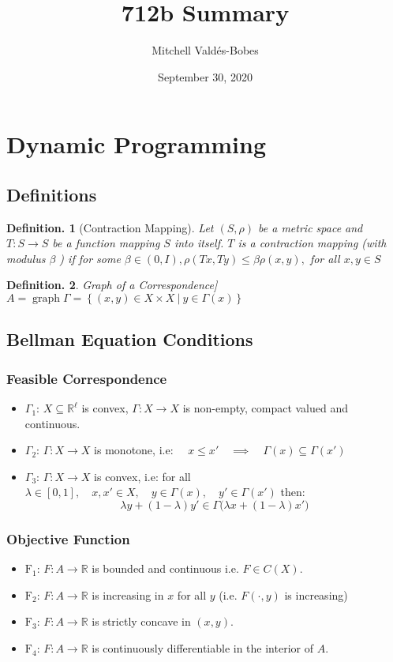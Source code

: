 \documentclass{article}
\title{712b Summary}
\author{Mitchell Valdés-Bobes}
\date{September 30, 2020}
\newtheorem{defin}{Definition.}
\theoremstyle{definition}
\begin{document}
\maketitle

\section{Dynamic Programming}
\subsection{Definitions}
\begin{defin}[Contraction Mapping]
Let $(S, \rho)$ be a metric space and $T: S \rightarrow S$ be a function mapping $S$ into itself. $T$ is a contraction mapping (with modulus $\beta$ ) if for some $\beta \in(0, I), \rho(T x, T y) \leq \beta \rho(x, y),$ for all $x, y \in S$
\end{defin}

\begin{defin}Graph of a Correspondence]
$A = \operatorname{graph}\Gamma = \left\{(x,y)\in X\times X \: |\:y\in \Gamma(x)\right\}$
\end{defin}


\subsection{Bellman Equation Conditions}
\subsubsection{Feasible Correspondence}
\begin{itemize}
    \item $\Gamma_1$:  $X\subseteq \mathbb {R}^\ell$ is convex, $\Gamma:X\to X$ is non-empty, compact valued and continuous.
    \item $\Gamma_2$:  $\Gamma:X\to X$ is monotone, i.e: $\quad x\leq x' \quad \implies \quad\Gamma(x)\subseteq \Gamma(x')$
    \item $\Gamma_3$:  $\Gamma:X\to X$ is convex, i.e: for all $\lambda\in [0,1], \quad x,x'\in X, \quad y\in \Gamma(x),\quad  y'\in\Gamma(x')$ then: $$\lambda y + (1-\lambda)y' \in \Gamma\big(\lambda x + (1-\lambda)x'\big)$$
\end{itemize}

\subsubsection{Objective Function}
\begin{itemize}
    \item $\mathrm{F}_1$:  $F:A\to\mathbb{R}$  is bounded and continuous i.e. $F\in C(X)$.
    \item $\mathrm{F}_2$:  $F:A\to\mathbb{R}$  is increasing in $x$ for all $y$ (i.e. $F(\cdot,y)$ is increasing)
    \item $\mathrm{F}_3$: $F:A\to\mathbb{R}$  is strictly concave in $(x,y)$.
    \item $\mathrm{F}_4$: $F:A\to\mathbb{R}$  is continuously differentiable in the interior of $A$.
\end{itemize}
\end{document}
